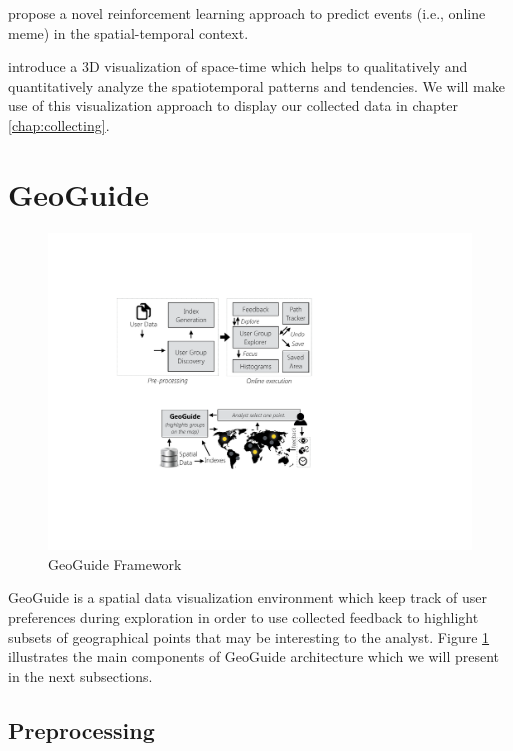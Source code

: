  propose a novel reinforcement learning approach to predict events (i.e., online meme) in the spatial-temporal context.

 introduce a 3D visualization of space-time which helps to qualitatively and quantitatively analyze the spatiotemporal patterns and tendencies. We will make use of this visualization approach to display our collected data in chapter \ref{chap:collecting}.

\section{GeoGuide}

\begin{figure}[t]
	\centering
	\includegraphics[width=\columnwidth]{imagens/framework}
	\caption{GeoGuide Framework}
	\label{fig:framework}
	\vspace{-10pt}
\end{figure}

GeoGuide \cite{omidvarTehrani2017} is a spatial data visualization environment which keep track of user preferences during exploration in order to use collected feedback to highlight subsets of geographical points that may be interesting to the analyst. Figure \ref{fig:framework} illustrates the main components of GeoGuide architecture which we will present in the next subsections.

\subsection{Preprocessing}

